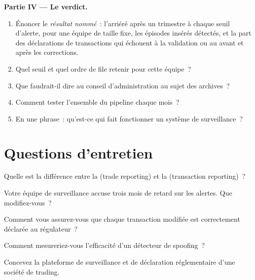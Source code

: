 \begin{problem}
\medskip\noindent\textbf{Partie IV --- Le verdict.}
\begin{enumerate}[resume]
\item Énoncer le \emph{résultat nommé}~: l'arriéré après un trimestre à chaque seuil d'alerte, pour une équipe de taille fixe, les épisodes insérés détectés,
et la part des déclarations de transactions qui échouent à la validation ou au  avant et après les corrections.
\item Quel seuil et quel ordre de file retenir pour cette équipe~?
\item Que faudrait-il dire au conseil d'administration au sujet des archives~?
\item Comment tester l'ensemble du pipeline chaque mois~?
\item En une phrase~: qu'est-ce qui fait fonctionner un système de surveillance~?
\end{enumerate}
\end{problem}

\section{Questions d'entretien}

\begin{interviewq}\label{iq:pl:surveillance-and-compliance-technology:1}
Quelle est la différence entre la  (trade reporting) et la  (transaction reporting)~?
\end{interviewq}

\begin{interviewq}\label{iq:pl:surveillance-and-compliance-technology:2}
Votre équipe de surveillance accuse trois mois de retard sur les alertes. Que modifiez-vous~?
\end{interviewq}

\begin{interviewq}\label{iq:pl:surveillance-and-compliance-technology:3}
Comment vous assurez-vous que chaque transaction modifiée est correctement déclarée au régulateur~?
\end{interviewq}

\begin{interviewq}\label{iq:pl:surveillance-and-compliance-technology:4}
Comment mesureriez-vous l'efficacité d'un détecteur de spoofing~?
\end{interviewq}

\begin{interviewq}\label{iq:pl:surveillance-and-compliance-technology:5}
Concevez la plateforme de surveillance et de déclaration réglementaire d'une société de trading.
\end{interviewq}
